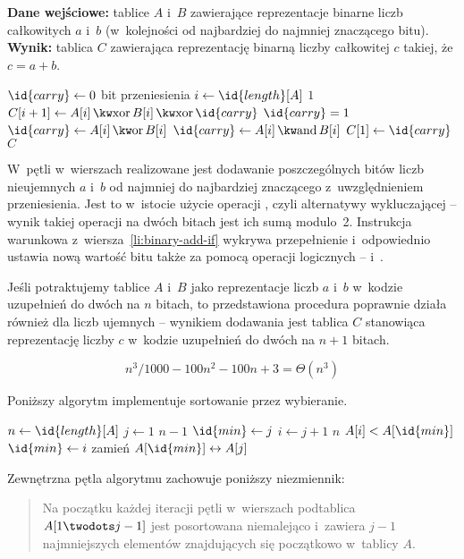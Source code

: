 \exercise %
\textbf{Dane wejściowe:}  tablice $A$ i~$B$ zawierające reprezentacje binarne  liczb całkowitych $a$ i~$b$ (w~kolejności od najbardziej do najmniej znaczącego bitu).\\
\textbf{Wynik:}  tablica $C$ zawierająca reprezentację binarną  liczby całkowitej $c$ takiej, że $c=a+b$.
\begin{codebox}
\li	$\id{carry}\gets0$ \>\>\>\>\Comment bit przeniesienia
\li	\For $i\gets\id{length}[A]$ \Downto $1$ \label{li:binary-add-for-begin}
\li		\Do
			$C[i+1]\gets A[i]\BitXor B[i]\BitXor\id{carry}$ \label{li:binary-add-xor}
\li			\If $\id{carry}=1$ \label{li:binary-add-if}
\li				\Then $\id{carry}\gets A[i]\BitOr B[i]$
\li				\Else $\id{carry}\gets A[i]\BitAnd B[i]$
				\End
		\End \label{li:binary-add-for-end}
\li	$C[1]\gets\id{carry}$
\li	\Return $C$
\end{codebox}

W~pętli  w~wierszach \twodashes{\ref{li:binary-add-for-begin}}{\ref{li:binary-add-for-end}} realizowane jest dodawanie poszczególnych bitów liczb nieujemnych $a$ i~$b$ od najmniej do najbardziej znaczącego z~uwzględnieniem przeniesienia. Jest to w~istocie użycie operacji , czyli alternatywy wykluczającej -- wynik takiej operacji na dwóch bitach jest ich sumą modulo~2. Instrukcja warunkowa z~wiersza~\ref{li:binary-add-if} wykrywa przepełnienie i~odpowiednio ustawia nową wartość bitu  także za pomocą operacji logicznych --  i~.

Jeśli potraktujemy tablice $A$ i~$B$ jako reprezentacje liczb $a$ i~$b$ w~kodzie uzupełnień do dwóch na $n$ bitach, to przedstawiona procedura poprawnie działa również dla liczb ujemnych -- wynikiem dodawania jest tablica $C$ stanowiąca reprezentację liczby $c$ w~kodzie uzupełnień do dwóch na $n+1$ bitach.


\exercise %
\[
	n^3\!/1000-100n^2-100n+3 = \Theta(n^3)
\]

\exercise %
Poniższy algorytm implementuje sortowanie przez wybieranie.
\begin{codebox}
\li	$n\gets\id{length}[A]$
\li	\For $j\gets1$ \To $n-1$ \label{li:selection-sort-for-begin}
\li		\Do
			$\id{min}\gets j$
\li			\For $i\gets j+1$ \To $n$
\li				\Do
					\If $A[i]<A[\id{min}]$
\li						\Then $\id{min}\gets i$
						\End
				\End
\li			zamień $A[\id{min}]\leftrightarrow A[j]$
		\End \label{li:selection-sort-for-end}
\end{codebox}
Zewnętrzna pętla algorytmu zachowuje poniższy niezmiennik:
\begin{quote}
Na początku każdej iteracji pętli  w~wierszach \twodashes{\ref{li:selection-sort-for-begin}}{\ref{li:selection-sort-for-end}} podtablica $A[1\twodots j-1]$ jest posortowana niemalejąco i~zawiera $j-1$ najmniejszych elementów znajdujących się początkowo w~tablicy $A$.
\end{quote}

